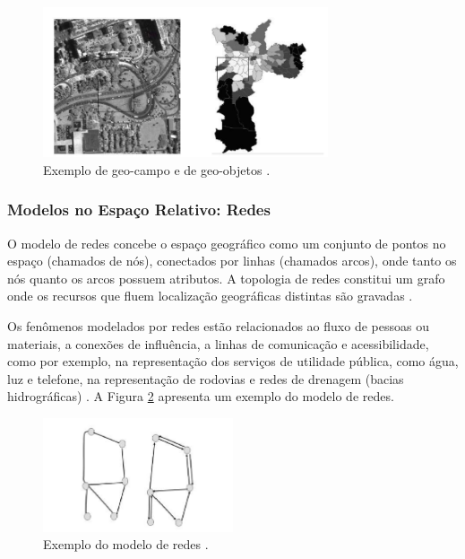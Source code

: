\begin{figure}[h]
\centering
\includegraphics[width=0.75\textwidth]{./img/cap_II/4-Geo-CamposObjetos}
\caption{Exemplo de geo-campo e de geo-objetos \cite{queirozferreira}.}
\label{fig:Geo-CamposObjetos}
\end{figure}

\newpage

\subsubsection{Modelos no Espaço Relativo: Redes}

O modelo de redes concebe o espaço geográfico como um conjunto de pontos no espaço (chamados de nós), conectados por linhas (chamados arcos), onde tanto os nós quanto os arcos possuem atributos. A topologia de redes constitui um grafo onde os recursos que fluem localização geográficas distintas são gravadas \cite{queirozferreira}.

Os fenômenos modelados por redes estão relacionados ao fluxo de pessoas ou materiais, a conexões de influência, a linhas de comunicação e acessibilidade, como por exemplo, na representação dos serviços de utilidade pública, como água, luz e telefone, na representação de rodovias e redes de drenagem (bacias hidrográficas) \cite{harley, queirozferreira}. A Figura \ref{fig:Redes} apresenta um exemplo  do modelo de redes.

\begin{figure}[h]
\centering
\includegraphics[width=0.50\textwidth]{./img/cap_II/5-Redes}
\caption{Exemplo do modelo de redes \cite{queirozferreira}.}
\label{fig:Redes}
\end{figure}

